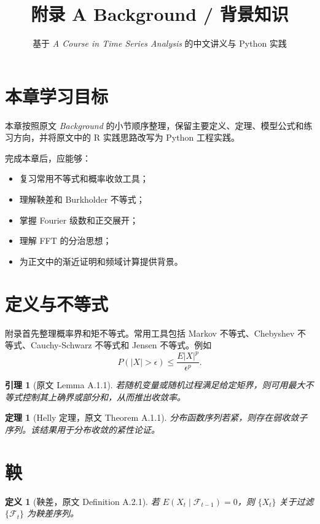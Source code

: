 \documentclass[11pt,a4paper]{ctexart}
\title{附录 A \quad Background / 背景知识}
\author{基于 \textit{A Course in Time Series Analysis} 的中文讲义与 Python 实践}
\date{}
\newtheorem{definition}{定义}[section]
\newtheorem{theorem}{定理}[section]
\newtheorem{lemma}{引理}[section]
\begin{document}
\maketitle

\section*{本章学习目标}

本章按照原文 \textit{Background} 的小节顺序整理，保留主要定义、定理、模型公式和练习方向，并将原文中的 R 实践思路改写为 Python 工程实践。

完成本章后，应能够：
\begin{itemize}
  \item 复习常用不等式和概率收敛工具；
  \item 理解鞅差和 Burkholder 不等式；
  \item 掌握 Fourier 级数和正交展开；
  \item 理解 FFT 的分治思想；
  \item 为正文中的渐近证明和频域计算提供背景。
\end{itemize}

\section{定义与不等式}

附录首先整理概率界和矩不等式。常用工具包括 Markov 不等式、Chebyshev 不等式、Cauchy-Schwarz 不等式和 Jensen 不等式。例如
\[
  P(|X|>\epsilon)\le \frac{E|X|^p}{\epsilon^p}.
\]

\begin{lemma}[原文 Lemma A.1.1]
若随机变量或随机过程满足给定矩界，则可用最大不等式控制其上确界或部分和，从而推出收敛率。
\end{lemma}

\begin{theorem}[Helly 定理，原文 Theorem A.1.1]
分布函数序列若紧，则存在弱收敛子序列。该结果用于分布收敛的紧性论证。
\end{theorem}

\section{鞅}

\begin{definition}[鞅差，原文 Definition A.2.1]
若 \(E(X_t\mid\mathcal F_{t-1})=0\)，则 \(\{X_t\}\) 关于过滤 \(\{\mathcal F_t\}\) 为鞅差序列。
\end{definition}
\end{document}
